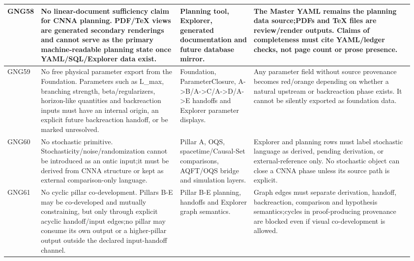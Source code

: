 \begin{longtable}{L{0.045\linewidth} L{0.345\linewidth} L{0.185\linewidth} L{0.39\linewidth}}
\hline
\addlinespace[0.24em]
GNG58 & No linear-document sufficiency claim for CNNA planning. PDF/\allowbreak{}TeX views are generated secondary renderings and cannot serve as the primary machine-readable planning state once YAML/\allowbreak{}SQL/\allowbreak{}Explorer data exist. & Planning tool, Explorer, generated documentation and future database mirror. & The Master YAML remains the planning data source;\newline PDFs and TeX files are review/\allowbreak{}render outputs. Claims of completeness must cite YAML/\allowbreak{}ledger checks, not page count or prose presence.\\
\hline
\addlinespace[0.24em]
GNG59 & No free physical parameter export from the Foundation. Parameters such as L\_max, branching strength, beta/\allowbreak{}regularizers, horizon-like quantities and backreaction inputs must have an internal origin, an explicit future backreaction handoff, or be marked unresolved. & Foundation, ParameterClosure, A->B/\allowbreak{}A->C/\allowbreak{}A->D/\allowbreak{}A->E handoffs and Explorer parameter displays. & Any parameter field without source provenance becomes red/\allowbreak{}orange depending on whether a natural upstream or backreaction phase exists. It cannot be silently exported as foundation data.\\
\hline
\addlinespace[0.24em]
GNG60 & No stochastic primitive. Stochasticity/\allowbreak{}noise/\allowbreak{}randomization cannot be introduced as an ontic input;\newline it must be derived from CNNA structure or kept as external comparison-only language. & Pillar A, OQS, spacetime/\allowbreak{}Causal-Set comparisons, AQFT/\allowbreak{}OQS bridge and simulation layers. & Explorer and planning rows must label stochastic language as derived, pending derivation, or external-reference only. No stochastic object can close a CNNA phase unless its source path is explicit.\\
\hline
\addlinespace[0.24em]
GNG61 & No cyclic pillar co-development. Pillars B-E may be co-developed and mutually constraining, but only through explicit acyclic handoff/\allowbreak{}input edges;\newline no pillar may consume its own output or a higher-pillar output outside the declared input-handoff channel. & Pillar B-E planning, handoffs and Explorer graph semantics. & Graph edges must separate derivation, handoff, backreaction, comparison and hypothesis semantics;\newline cycles in proof-producing provenance are blocked even if visual co-development is allowed.\\

\end{longtable}
